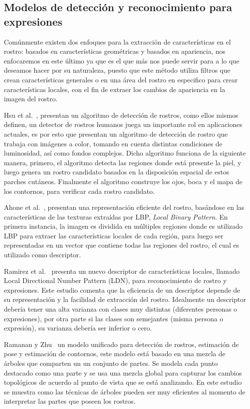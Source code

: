 \subsection{Modelos de detección y reconocimiento para expresiones}
Comúnmente existen dos enfoques para la extracción de características en el rostro: basados en características geométricas y basados en apariencia, nos enfocaremos en este último ya que es el que más nos puede servir para a lo que deseamos hacer por su naturaleza, puesto que este método utiliza filtros que crean características generales o en una área del rostro en especifico para crear características locales, con el fin de extraer los cambios de apariencia en la imagen del rostro.

Hsu et al.~\cite{Hsu2002}, presentan un algoritmo de detección de rostros, como ellos mismos definen, un detector de rostros humanos juega un importante rol en aplicaciones actuales, es por esto que presentan un algoritmo de detección de rostro que trabaja con imágenes a color, tomando en cuenta distintas condiciones de luminosidad, así como fondos complejos. Dicho algoritmo funciona de la siguiente manera, primero, el algoritmo detecta las regiones donde está presente la piel, y luego genera un rostro candidato basados en la disposición espacial de estos parches cutáneos. Finalmente el algoritmo construye los ojos, boca y el mapa de los contornos, para verificar cada rostro candidato.

Ahone et al.~\cite{ahonen2006}, presentan una representación eficiente del rostro, basándose en las características de las texturas extraídas por LBP, \textit{Local Binary Pattern}. En primera instancia, la imagen es dividida en múltiples regiones donde es utilizado LBP para extraer las características locales de cada región, para luego ser representadas en un vector que contiene todas las regiones del rostro, el cual es utilizado como descriptor.

Ramirez et al.~\cite{ldnp2013} presenta un nuevo descriptor de características locales, llamado Local Directional Number Pattern (LDN), para reconocimiento de rostro y expresiones. Este estudio comenta que la eficiencia de un descriptor depende de su representación y la facilidad de extracción del rostro. Idealmente un descriptor debería tener una alta varianza con clases muy distintas (diferentes personas o expresiones), por otra parte si las clases son semejantes (misma persona o expresión), su varianza debería ser inferior o cero.

Ramanan y Zhu~\cite{Zhu2012} un modelo unificado para detección de rostros, estimación de pose y estimación de contornos, este modelo está basado en una mezcla de árboles que comparten un un conjunto de partes. Se modela cada punto destacado como una parte y se usa una mezcla global para capturar los cambios topológicos de acuerdo al punto de vista que se está analizando. En este estudio se muestra como las técnicas de árboles pueden ser muy eficientes al momento de interpretar las partes que poseen los rostros.


